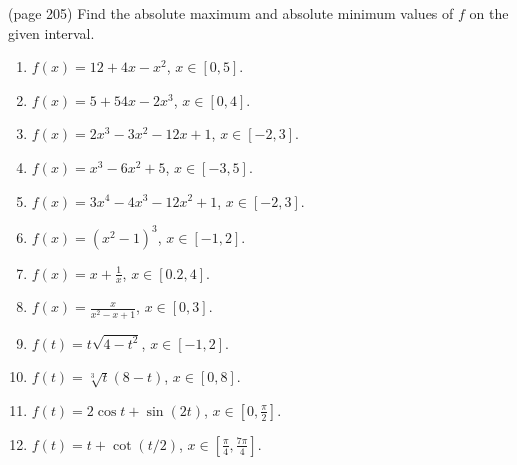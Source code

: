 \begin{problem}(page 205)
Find the absolute maximum and absolute minimum values of $f$ on the given interval.
\begin{multicols}{3}
\begin{enumerate}
\item $f(x)=12+4x-x^2$, $x\in [0,5]$.
\item $f(x)=5+54x-2x^3$, $x\in[0,4] $.
\item $f(x)=2x^3-3x^2-12x+1$, $x\in [-2,3]$.
\item $f(x)=x^3-6x^2+5$, $x\in [-3, 5]$.
\item $f(x)=3x^4-4x^3-12x^2+1$, $x\in [-2, 3]$.
\item $f(x)=(x^2-1)^3$, $x\in [-1, 2]$.
\item $f(x)=x+\frac{1}{x}$, $x\in [0.2,4 ]$.
\item $f(x)=\frac{x}{x^2-x+1}$, $x\in [0,3 ]$.
\item $f(t)=t\sqrt{4-t^2}$, $x\in [-1,2 ]$.
\item $f(t)=\sqrt[3]{t}(8-t) $, $x\in [0,8 ]$.
\item $f(t)=2\cos t+\sin (2t)$, $x\in [0,\frac{\pi}{2} ]$.
\item $f(t)=t+\cot (t/2) $, $x\in [\frac{\pi}{4},\frac{7\pi}{4} ]$.
\end{enumerate}
\end{multicols}
\end{problem}